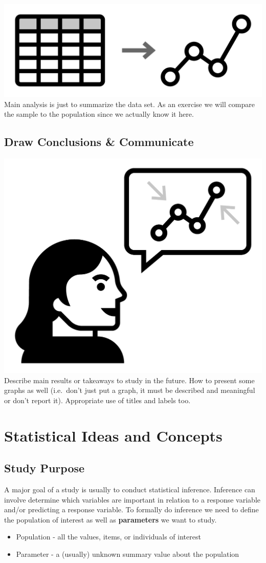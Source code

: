\documentclass[
]{book}
\theoremstyle{definition}
\theoremstyle{definition}
\theoremstyle{definition}
\theoremstyle{remark}
\begin{document}
\includegraphics[width=0.13\linewidth,style="float:left; padding:10px"]{img/statsAnalysis}
Main analysis is just to summarize the data set. As an exercise we will compare the sample to the population since we actually know it here.

\hypertarget{draw-conclusions-communicate-2}{%
\subsection{Draw Conclusions \& Communicate}\label{draw-conclusions-communicate-2}}

\includegraphics[width=0.13\linewidth,style="float:left; padding:10px"]{img/concludeCommunicate}
Describe main results or takeaways to study in the future. How to present some graphs as well (i.e.~don't just put a graph, it must be described and meaningful or don't report it). Appropriate use of titles and labels too.

\hypertarget{statistical-ideas-and-concepts-1}{%
\section{Statistical Ideas and Concepts}\label{statistical-ideas-and-concepts-1}}

\hypertarget{study-purpose}{%
\subsection{Study Purpose}\label{study-purpose}}

A major goal of a study is usually to conduct statistical inference. Inference can involve determine which variables are important in relation to a response variable and/or predicting a response variable. To formally do inference we need to define the population of interest as well as \textbf{parameters} we want to study.

\begin{itemize}
\item
  Population - all the values, items, or individuals of interest
\item
  Parameter - a (usually) unknown summary value about the population
\end{itemize}
\end{document}
